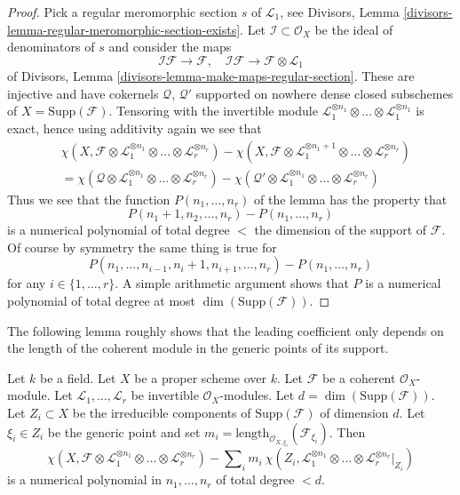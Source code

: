 \begin{proof}
\medskip\noindent
Pick a regular meromorphic section $s$ of $\mathcal{L}_1$, see
Divisors, Lemma \ref{divisors-lemma-regular-meromorphic-section-exists}.
Let $\mathcal{I} \subset \mathcal{O}_X$ be the ideal of
denominators of $s$ and consider the maps
$$
\mathcal{I}\mathcal{F} \to \mathcal{F},\quad
\mathcal{I}\mathcal{F} \to \mathcal{F} \otimes \mathcal{L}_1
$$
of Divisors, Lemma \ref{divisors-lemma-make-maps-regular-section}.
These are injective and have cokernels $\mathcal{Q}$, $\mathcal{Q}'$
supported on nowhere dense closed subschemes of $X = \text{Supp}(\mathcal{F})$.
Tensoring with the invertible module
$\mathcal{L}_1^{\otimes n_1} \otimes \ldots \otimes \mathcal{L}_1^{\otimes n_1}$
is exact, hence using additivity again
we see that
\begin{align*}
&\chi(X, \mathcal{F} \otimes \mathcal{L}_1^{\otimes n_1} \otimes \ldots \otimes
\mathcal{L}_r^{\otimes n_r}) -
\chi(X, \mathcal{F} \otimes \mathcal{L}_1^{\otimes n_1 + 1}
\otimes \ldots \otimes \mathcal{L}_r^{\otimes n_r}) \\
& =
\chi(\mathcal{Q} \otimes \mathcal{L}_1^{\otimes n_1} \otimes \ldots \otimes
\mathcal{L}_r^{\otimes n_r}) -
\chi(\mathcal{Q}' \otimes \mathcal{L}_1^{\otimes n_1} \otimes \ldots \otimes
\mathcal{L}_r^{\otimes n_r})
\end{align*}
Thus we see that the function $P(n_1, \ldots, n_r)$ of the lemma has
the property that
$$
P(n_1 + 1, n_2, \ldots, n_r) - P(n_1, \ldots, n_r)
$$
is a numerical polynomial of total degree $<$ the dimension
of the support of $\mathcal{F}$. Of course by symmetry the same
thing is true for
$$
P(n_1, \ldots, n_{i - 1}, n_i + 1, n_{i + 1}, \ldots, n_r)
- P(n_1, \ldots, n_r)
$$
for any $i \in \{1, \ldots, r\}$. A simple arithmetic argument shows
that $P$ is a numerical polynomial of total degree at most
$\dim(\text{Supp}(\mathcal{F}))$.
\end{proof}

\noindent
The following lemma roughly shows that the leading coefficient only depends
on the length of the coherent module in the generic points of its
support.

\begin{lemma}
\label{lemma-numerical-polynomial-leading-term}
Let $k$ be a field. Let $X$ be a proper scheme over $k$. Let
$\mathcal{F}$ be a coherent $\mathcal{O}_X$-module. Let
$\mathcal{L}_1, \ldots, \mathcal{L}_r$ be invertible $\mathcal{O}_X$-modules.
Let $d = \dim(\text{Supp}(\mathcal{F}))$.
Let $Z_i \subset X$ be the irreducible components
of $\text{Supp}(\mathcal{F})$ of dimension $d$. Let $\xi_i \in Z_i$
be the generic point and set
$m_i = \text{length}_{\mathcal{O}_{X, \xi_i}}(\mathcal{F}_{\xi_i})$.
Then
$$
\chi(X, \mathcal{F} \otimes \mathcal{L}_1^{\otimes n_1} \otimes \ldots \otimes
\mathcal{L}_r^{\otimes n_r}) -
\sum\nolimits_i
m_i\ \chi(Z_i, \mathcal{L}_1^{\otimes n_1} \otimes \ldots \otimes
\mathcal{L}_r^{\otimes n_r}|_{Z_i})
$$
is a numerical polynomial in $n_1, \ldots, n_r$ of total degree $< d$.
\end{lemma}

